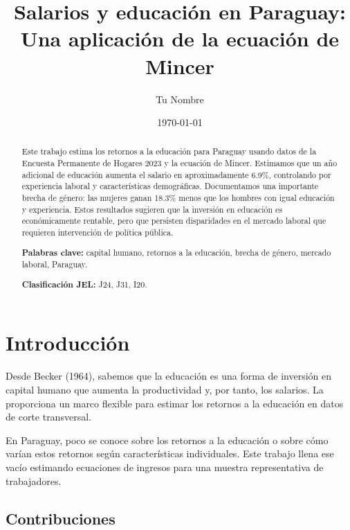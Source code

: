 \documentclass[12pt, a4paper]{article}
\title{Salarios y educación en Paraguay:\\Una aplicación de la ecuación de Mincer}
\author{Tu Nombre}
\date{\today}
\theoremstyle{definition}
\theoremstyle{remark}
\begin{document}

\maketitle
\thispagestyle{empty}

\begin{abstract}
\noindent
Este trabajo estima los retornos a la educación para Paraguay usando datos 
de la Encuesta Permanente de Hogares 2023 y la ecuación de Mincer. Estimamos 
que un año adicional de educación aumenta el salario en aproximadamente 
6.9\%, controlando por experiencia laboral y características demográficas. 
Documentamos una importante brecha de género: las mujeres ganan 18.3\% menos 
que los hombres con igual educación y experiencia. Estos resultados sugieren 
que la inversión en educación es económicamente rentable, pero que persisten 
disparidades en el mercado laboral que requieren intervención de política pública.

\vspace{0.5em}
\noindent \textbf{Palabras clave:} capital humano, retornos a la educación, 
brecha de género, mercado laboral, Paraguay.

\noindent \textbf{Clasificación JEL:} J24, J31, I20.
\end{abstract}

\newpage
\tableofcontents
\newpage

\section{Introducción}

Desde Becker (1964), sabemos que la educación es una forma de inversión en 
capital humano que aumenta la productividad y, por tanto, los salarios. La 
\textcite{mincer1974} proporciona un marco flexible para estimar los retornos 
a la educación en datos de corte transversal.

En Paraguay, poco se conoce sobre los retornos a la educación o sobre cómo 
varían estos retornos según características individuales. Este trabajo llena 
ese vacío estimando ecuaciones de ingresos para una muestra representativa 
de trabajadores.

\subsection{Contribuciones}
\end{document}
